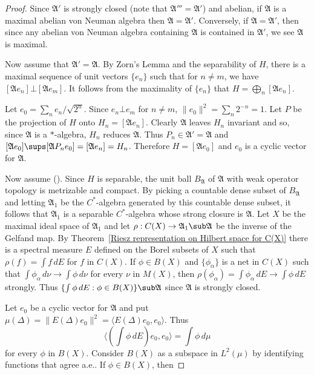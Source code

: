 \begin{proof}
Since $\mathfrak{A}'$ is strongly closed (note that $\mathfrak{A}'''=\mathfrak{A}'$) and abelian, if $\mathfrak{A}$ is a maximal abelian von Neuman algebra then $\mathfrak{A}=\mathfrak{A}'$. Conversely, if $\mathfrak{A}=\mathfrak{A}'$, then since any abelian von Neuman algebra containing $\mathfrak{A}$ is contained in $\mathfrak{A}'$, we see $\mathfrak{A}$ is maximal.\par
Now assume that $\mathfrak{A}'=\mathfrak{A}$. By Zorn's Lemma and the separability of $H$, there is a maximal sequence of unit vectors $\{e_n\}$ such that for $n\neq m$, we have $[\mathfrak{A}e_n]\bot[\mathfrak{A}e_m]$. It follows from the maximality of $\{e_n\}$ that $H=\bigoplus_n[\mathfrak{A}e_n]$.\par
Let $e_0=\sum_ne_n/\sqrt{2^n}$. Since $e_n\bot e_m$ for $n\neq m$, $\|e_0\|^2=\sum_n2^{-n}=1$. Let $P$ be the projection of $H$ onto $H_n=[\mathfrak{A}e_n]$. Clearly $\mathfrak{A}$ leaves $H_n$ invariant and so, since $\mathfrak{A}$ is a $*$-algebra, $H_n$ reduces $\mathfrak{A}$. Thus $P_n\in\mathfrak{A}'=\mathfrak{A}$ and $[\mathfrak{A}e_0]\sups[\mathfrak{A}P_ne_0]=[\mathfrak{A}e_n]=H_n$. Therefore $H=[\mathfrak{A}e_0]$ and $e_0$ is a cyclic vector for $\mathfrak{A}$.\par
Now assume (). Since $H$ is separable, the unit ball $B_{\mathfrak{A}}$ of $\mathfrak{A}$ with weak operator topology is metrizable and compact. By picking a countable dense subset of $B_{\mathfrak{A}}$ and letting $\mathfrak{A}_1$ be the $C^*$-algebra generated by this countable dense subset, it follows that $\mathfrak{A}_1$ is a separable $C^*$-algebra whose strong closure is $\mathfrak{A}$. Let $X$ be the maximal ideal space of $\mathfrak{A}_1$ and let $\rho:C(X)\to\mathfrak{A}_1\sub\mathfrak{A}$ be the inverse of the Gelfand map. By Theorem~\ref{Riesz representation on Hilbert space for C(X)} there is a spectral measure $E$ defined on the Borel subsets of $X$ such that $\rho(f)=\int f\,dE$ for $f$ in $C(X)$. If $\phi\in B(X)$ and $\{\phi_\alpha\}$ is a net in $C(X)$ such that $\int\phi_\alpha\,d\nu\to\int\phi\,d\nu$ for every $\nu$ in $M(X)$, then $\rho(\phi_\alpha)=\int\phi_\alpha\,dE\to\int\phi\,dE$ strongly. Thus $\{\int\phi\,dE:\phi\in B(X)\}\sub\mathfrak{A}$ since $\mathfrak{A}$ is strongly closed.\par
Let $e_0$ be a cyclic vector for $\mathfrak{A}$ and put $\mu(\Delta)=\|E(\Delta)e_0\|^2=\langle E(\Delta)e_0,e_0\rangle$. Thus
\[\langle(\int\phi\,dE)e_0,e_0\rangle=\int\phi\,d\mu\]
for every $\phi$ in $B(X)$. Consider $B(X)$ as a subspace in $L^2(\mu)$ by identifying functions that agree a.e.. If $\phi\in B(X)$, then

\end{proof}

